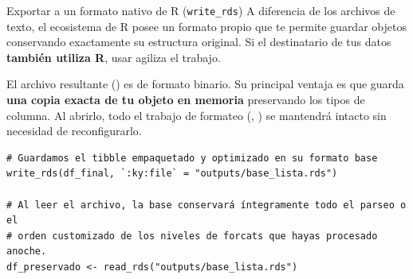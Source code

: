 \documentclass[8pt]{beamer}
\begin{document}
	\begin{frame}[fragile]{Exportar a un formato nativo de R (\texttt{write\_rds})}
		A diferencia de los archivos de texto, el ecosistema de R posee un formato propio que te permite guardar objetos conservando exactamente su estructura original. Si el destinatario de tus datos \textbf{también utiliza R}, usar  agiliza el trabajo.
		
		\vspace{1em}
		El archivo resultante () es de formato binario. Su principal ventaja es que guarda \textbf{una copia exacta de tu objeto en memoria} preservando los tipos de columna. Al abrirlo, todo el trabajo de formateo (, ) se mantendrá intacto sin necesidad de reconfigurarlo.
		
\begin{lstlisting}[style=RScript]
# Guardamos el tibble empaquetado y optimizado en su formato base
write_rds(df_final, `:ky:file` = "outputs/base_lista.rds")

# Al leer el archivo, la base conservará íntegramente todo el parseo o el
# orden customizado de los niveles de forcats que hayas procesado anoche.
df_preservado <- read_rds("outputs/base_lista.rds")
\end{lstlisting}
	\end{frame}
\end{document}
